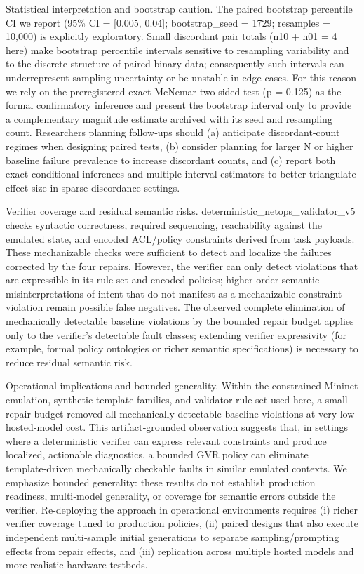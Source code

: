 \documentclass[conference]{IEEEtran}
\begin{document}
Statistical interpretation and bootstrap caution. The paired bootstrap percentile CI we report (95\% CI = [0.005, 0.04]; bootstrap\_seed = 1729; resamples = 10,000) is explicitly exploratory. Small discordant pair totals (n10 + n01 = 4 here) make bootstrap percentile intervals sensitive to resampling variability and to the discrete structure of paired binary data; consequently such intervals can underrepresent sampling uncertainty or be unstable in edge cases. For this reason we rely on the preregistered exact McNemar two‑sided test (p = 0.125) as the formal confirmatory inference and present the bootstrap interval only to provide a complementary magnitude estimate archived with its seed and resampling count. Researchers planning follow‑ups should (a) anticipate discordant‑count regimes when designing paired tests, (b) consider planning for larger N or higher baseline failure prevalence to increase discordant counts, and (c) report both exact conditional inferences and multiple interval estimators to better triangulate effect size in sparse discordance settings.

Verifier coverage and residual semantic risks. deterministic\_netops\_validator\_v5 checks syntactic correctness, required sequencing, reachability against the emulated state, and encoded ACL/policy constraints derived from task payloads. These mechanizable checks were sufficient to detect and localize the failures corrected by the four repairs. However, the verifier can only detect violations that are expressible in its rule set and encoded policies; higher‑order semantic misinterpretations of intent that do not manifest as a mechanizable constraint violation remain possible false negatives. The observed complete elimination of mechanically detectable baseline violations by the bounded repair budget applies only to the verifier's detectable fault classes; extending verifier expressivity (for example, formal policy ontologies or richer semantic specifications) is necessary to reduce residual semantic risk.

Operational implications and bounded generality. Within the constrained Mininet emulation, synthetic template families, and validator rule set used here, a small repair budget removed all mechanically detectable baseline violations at very low hosted‑model cost. This artifact‑grounded observation suggests that, in settings where a deterministic verifier can express relevant constraints and produce localized, actionable diagnostics, a bounded GVR policy can eliminate template‑driven mechanically checkable faults in similar emulated contexts. We emphasize bounded generality: these results do not establish production readiness, multi‑model generality, or coverage for semantic errors outside the verifier. Re-deploying the approach in operational environments requires (i) richer verifier coverage tuned to production policies, (ii) paired designs that also execute independent multi‑sample initial generations to separate sampling/prompting effects from repair effects, and (iii) replication across multiple hosted models and more realistic hardware testbeds.
\end{document}
